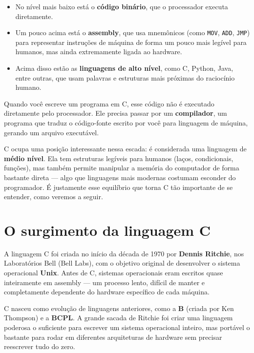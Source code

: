 \documentclass[12pt,a4paper,oneside]{extreport}
\begin{document}
\begin{itemize}

    \item No nível mais baixo está o \textbf{código binário}, que o processador executa diretamente.
    \item Um pouco acima está o \textbf{assembly}, que usa mnemônicos (como \texttt{MOV}, \texttt{ADD}, \texttt{JMP}) para representar instruções de máquina de forma um pouco mais legível para humanos, mas ainda extremamente ligada ao hardware.
    \item Acima disso estão as \textbf{linguagens de alto nível}, como C, Python, Java, entre outras, que usam palavras e estruturas mais próximas do raciocínio humano.
    
\end{itemize}


Quando você escreve um programa em C, esse código não é executado diretamente pelo processador. Ele precisa passar por um \textbf{compilador}, um programa que traduz o código-fonte escrito por você para linguagem de máquina, gerando um arquivo executável.

C ocupa uma posição interessante nessa escada: é considerada uma linguagem de \textbf{médio nível}. Ela tem estruturas legíveis para humanos (laços, condicionais, funções), mas também permite manipular a memória do computador de forma bastante direta — algo que linguagens mais modernas costumam esconder do programador. É justamente esse equilíbrio que torna C tão importante de se entender, como veremos a seguir.


\section{O surgimento da linguagem C}

A linguagem C foi criada no início da década de 1970 por \textbf{Dennis Ritchie}, nos Laboratórios Bell (Bell Labs), com o objetivo original de desenvolver o sistema operacional \textbf{Unix}. Antes de C, sistemas operacionais eram escritos quase inteiramente em assembly — um processo lento, difícil de manter e completamente dependente do hardware específico de cada máquina.

C nasceu como evolução de linguagens anteriores, como a \textbf{B} (criada por Ken Thompson) e a \textbf{BCPL}. A grande sacada de Ritchie foi criar uma linguagem poderosa o suficiente para escrever um sistema operacional inteiro, mas portável o bastante para rodar em diferentes arquiteturas de hardware sem precisar reescrever tudo do zero.
\end{document}
